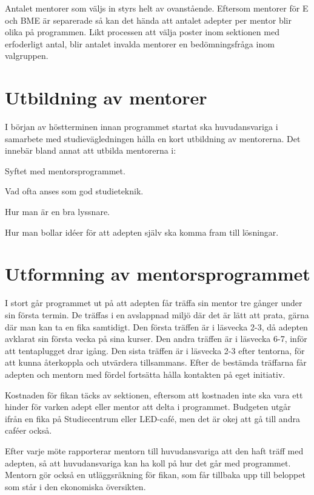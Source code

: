 \documentclass[10pt]{article}
\begin{document}
    Antalet mentorer som väljs in styrs helt av ovanstående. Eftersom mentorer för E och BME är separerade så kan det hända att antalet adepter per mentor blir olika på programmen. Likt processen att välja poster inom sektionen med erfoderligt antal, blir antalet invalda mentorer en bedömningsfråga inom valgruppen.

    \newpage

    \section{Utbildning av mentorer}
    I början av höstterminen innan programmet startat ska huvudansvariga i samarbete med studievägledningen hålla en kort utbildning av mentorerna.
    Det innebär bland annat att utbilda mentorerna i:
    \begin{dashlist}
        \item Syftet med mentorsprogrammet.
        \item Vad ofta anses som god studieteknik.
        \item Hur man är en bra lyssnare.
        \item Hur man bollar idéer för att adepten själv ska komma fram till lösningar.
    \end{dashlist}

    \section{Utformning av mentorsprogrammet}
    I stort går programmet ut på att adepten får träffa sin mentor tre gånger under sin första termin.
    De träffas i en avslappnad miljö där det är lätt att prata, gärna där man kan ta en fika samtidigt.
    Den första träffen är i läsvecka 2-3, då adepten avklarat sin första vecka på sina kurser.
    Den andra träffen är i läsvecka 6-7, inför att tentaplugget drar igång.
    Den sista träffen är i läsvecka 2-3 efter tentorna, för att kunna återkoppla och utvärdera tillsammans.
    Efter de bestämda träffarna får adepten och mentorn med fördel fortsätta hålla kontakten på eget initiativ.

    Kostnaden för fikan täcks av sektionen, eftersom att kostnaden inte ska vara ett hinder för varken adept eller mentor att delta i programmet.
    Budgeten utgår ifrån en fika på Studiecentrum eller LED-café, men det är okej att gå till andra caféer också.

    Efter varje möte rapporterar mentorn till huvudansvariga att den haft träff med adepten, så att huvudansvariga kan ha koll på hur det går med programmet.
    Mentorn gör också en utläggsräkning för fikan, som får tillbaka upp till beloppet som står i den ekonomiska översikten.
\end{document}
